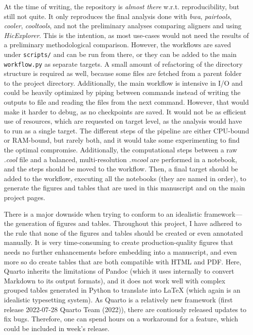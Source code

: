\documentclass[
  11pt,
  a4paper,
]{scrbook}
\begin{document}
At the time of writing, the repository is \emph{almost there} w.r.t.
reproducibility, but still not quite. It only reproduces the final
analysis done with \emph{bwa}, \emph{pairtools}, \emph{cooler},
\emph{cooltools}, and not the preliminary analyses comparing aligners
and using \emph{HicExplorer}. This is the intention, as most use-cases
would not need the results of a preliminary methodological comparison.
However, the workflows are saved under \texttt{scripts/} and can be run
from there, or they can be added to the main \texttt{workflow.py} as
separate targets. A small amount of refactoring of the directory
structure is required as well, because some files are fetched from a
parent folder to the project directory. Additionally, the main workflow
is intensive in I/O and could be heavily optimized by piping between
commands instead of writing the outputs to file and reading the files
from the next command. However, that would make it harder to debug, as
no checkpoints are saved. It would not be as efficient use of resources,
which are requested on target level, as the analysis would have to run
as a single target. The different steps of the pipeline are either
CPU-bound or RAM-bound, but rarely both, and it would take some
experimenting to find the optimal compromise. Additionally, the
computational steps between a raw \emph{.cool} file and a balanced,
multi-resolution \emph{.mcool} are performed in a notebook, and the
steps should be moved to the workflow. Then, a final target should be
added to the workflow, executing all the notebooks (they are named in
order), to generate the figures and tables that are used in this
manuscript and on the main project pages.

There is a major downside when trying to conform to an idealistic
framework---the generation of figures and tables. Throughout this
project, I have adhered to the rule that none of the figures and tables
should be created or even annotated manually. It is very time-consuming
to create production-quality figures that needs no further enhancements
before embedding into a manuscript, and even more so do create tables
that are both compatible with HTML and PDF. Here, Quarto inherits the
limitations of Pandoc (which it uses internally to convert Markdown to
its output formats), and it does not work well with complex grouped
tables generated in Python to translate into LaTeX (which again is an
idealistic typesetting system). As Quarto is a relatively new framework
(first release 2022-07-28 Quarto Team (2022)), there are contiously
released updates to fix bugs. Therefore, one can spend hours on a
workaround for a feature, which could be included in week's release.
\end{document}
